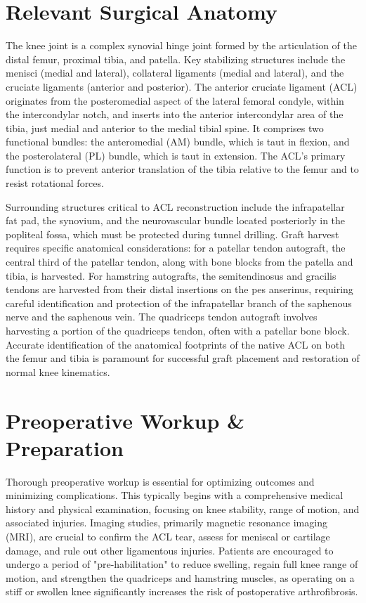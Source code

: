 \section*{Relevant Surgical Anatomy}
The knee joint is a complex synovial hinge joint formed by the articulation of the distal femur, proximal tibia, and patella. Key stabilizing structures include the menisci (medial and lateral), collateral ligaments (medial and lateral), and the cruciate ligaments (anterior and posterior). The anterior cruciate ligament (ACL) originates from the posteromedial aspect of the lateral femoral condyle, within the intercondylar notch, and inserts into the anterior intercondylar area of the tibia, just medial and anterior to the medial tibial spine. It comprises two functional bundles: the anteromedial (AM) bundle, which is taut in flexion, and the posterolateral (PL) bundle, which is taut in extension. The ACL's primary function is to prevent anterior translation of the tibia relative to the femur and to resist rotational forces.

Surrounding structures critical to ACL reconstruction include the infrapatellar fat pad, the synovium, and the neurovascular bundle located posteriorly in the popliteal fossa, which must be protected during tunnel drilling. Graft harvest requires specific anatomical considerations: for a patellar tendon autograft, the central third of the patellar tendon, along with bone blocks from the patella and tibia, is harvested. For hamstring autografts, the semitendinosus and gracilis tendons are harvested from their distal insertions on the pes anserinus, requiring careful identification and protection of the infrapatellar branch of the saphenous nerve and the saphenous vein. The quadriceps tendon autograft involves harvesting a portion of the quadriceps tendon, often with a patellar bone block. Accurate identification of the anatomical footprints of the native ACL on both the femur and tibia is paramount for successful graft placement and restoration of normal knee kinematics.

\section*{Preoperative Workup \& Preparation}
Thorough preoperative workup is essential for optimizing outcomes and minimizing complications. This typically begins with a comprehensive medical history and physical examination, focusing on knee stability, range of motion, and associated injuries. Imaging studies, primarily magnetic resonance imaging (MRI), are crucial to confirm the ACL tear, assess for meniscal or cartilage damage, and rule out other ligamentous injuries. Patients are encouraged to undergo a period of "pre-habilitation" to reduce swelling, regain full knee range of motion, and strengthen the quadriceps and hamstring muscles, as operating on a stiff or swollen knee significantly increases the risk of postoperative arthrofibrosis.

